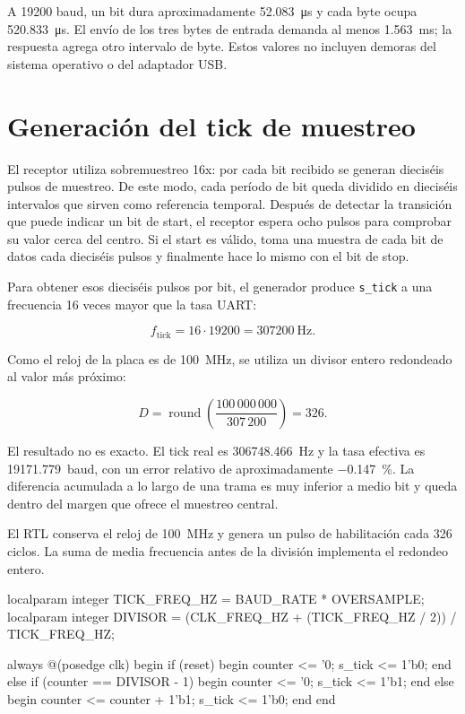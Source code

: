 A \num{19200} baud, un bit dura aproximadamente
\SI{52.083}{\micro\second} y cada byte ocupa
\SI{520.833}{\micro\second}. El envío de los tres bytes de entrada
demanda al menos \SI{1.563}{\milli\second}; la respuesta agrega otro
intervalo de byte. Estos valores no incluyen demoras del sistema
operativo o del adaptador USB.

\section{Generación del tick de muestreo}

El receptor utiliza sobremuestreo 16x: por cada bit recibido se
generan dieciséis pulsos de muestreo. De este modo, cada período de
bit queda dividido en dieciséis intervalos que sirven como referencia
temporal. Después de detectar la transición que puede indicar un bit
de start, el receptor espera ocho pulsos para comprobar su valor
cerca del centro. Si el start es válido, toma una muestra de cada bit
de datos cada dieciséis pulsos y finalmente hace lo mismo con el bit de stop.

Para obtener esos dieciséis pulsos por bit, el generador produce
\texttt{s\_tick} a una frecuencia 16 veces mayor que la tasa UART:

\begin{equation}
  f_{\mathrm{tick}} = 16 \cdot 19200 =
  \SI{307200}{\hertz}.
\end{equation}

Como el reloj de la placa es de \SI{100}{\mega\hertz}, se utiliza un
divisor entero redondeado al valor más próximo:

\begin{equation}
  D = \operatorname{round}
  \left(\frac{100\,000\,000}{307\,200}\right) = 326.
\end{equation}

El resultado no es exacto. El tick real es \SI{306748.466}{\hertz} y
la tasa efectiva es \SI{19171.779}{baud}, con un error relativo de
aproximadamente \SI{-0.147}{\percent}. La diferencia acumulada a lo
largo de una trama es muy inferior a medio bit y queda dentro del
margen que ofrece el muestreo central.

El RTL conserva el reloj de \SI{100}{\mega\hertz} y genera un pulso
de habilitación cada 326 ciclos. La suma de media frecuencia antes de
la división implementa el redondeo entero.

\begin{codebox}[language=SystemVerilog]
localparam integer TICK_FREQ_HZ = BAUD_RATE * OVERSAMPLE;
localparam integer DIVISOR =
  (CLK_FREQ_HZ + (TICK_FREQ_HZ / 2)) / TICK_FREQ_HZ;

always @(posedge clk) begin
  if (reset) begin
    counter <= '0;
    s_tick  <= 1'b0;
  end else if (counter == DIVISOR - 1) begin
    counter <= '0;
    s_tick  <= 1'b1;
  end else begin
    counter <= counter + 1'b1;
    s_tick  <= 1'b0;
  end
end
\end{codebox}

